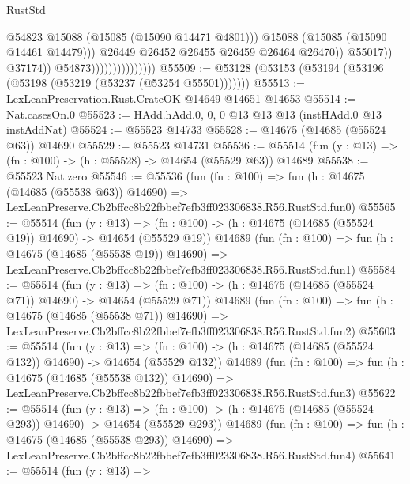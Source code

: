 \begin{lexlean}{RustStd}
\begin{coremodule}
                                                  @54823
                                                  @15088
                                                  (@15085 (@15090 @14471 @4801)))
                                                @15088
                                                (@15085 (@15090 @14461 @14479)))
                                              @26449
                                              @26452
                                              @26455
                                              @26459
                                              @26464
                                              @26470))
                                          @55017))
                                      @37174))
                                  @54873)))))))))))))))
@55509 := @53128 (@53153 (@53194 (@53196 (@53198 (@53219 (@53237 (@53254 @55501)))))))
@55513 := LexLeanPreservation.Rust.CrateOK @14649 @14651 @14653
@55514 := Nat.casesOn.{0}
@55523 := HAdd.hAdd.{0, 0, 0} @13 @13 @13 (instHAdd.{0} @13 instAddNat)
@55524 := @55523 @14733
@55528 := @14675 (@14685 (@55524 @63)) @14690
@55529 := @55523 @14731
@55536 := @55514 (fun (y : @13) => (fn : @100) -> (h : @55528) -> @14654 (@55529 @63)) @14689
@55538 := @55523 Nat.zero
@55546 := @55536
    (fun (fn : @100) =>
    fun (h : @14675 (@14685 (@55538 @63)) @14690) =>
    LexLeanPreserve.Cb2bffcc8b22fbbef7efb3ff023306838.R56.RustStd.fun0)
@55565 := @55514
    (fun (y : @13) =>
    (fn : @100) -> (h : @14675 (@14685 (@55524 @19)) @14690) -> @14654 (@55529 @19))
    @14689
    (fun (fn : @100) =>
    fun (h : @14675 (@14685 (@55538 @19)) @14690) =>
    LexLeanPreserve.Cb2bffcc8b22fbbef7efb3ff023306838.R56.RustStd.fun1)
@55584 := @55514
    (fun (y : @13) =>
    (fn : @100) -> (h : @14675 (@14685 (@55524 @71)) @14690) -> @14654 (@55529 @71))
    @14689
    (fun (fn : @100) =>
    fun (h : @14675 (@14685 (@55538 @71)) @14690) =>
    LexLeanPreserve.Cb2bffcc8b22fbbef7efb3ff023306838.R56.RustStd.fun2)
@55603 := @55514
    (fun (y : @13) =>
    (fn : @100) -> (h : @14675 (@14685 (@55524 @132)) @14690) -> @14654 (@55529 @132))
    @14689
    (fun (fn : @100) =>
    fun (h : @14675 (@14685 (@55538 @132)) @14690) =>
    LexLeanPreserve.Cb2bffcc8b22fbbef7efb3ff023306838.R56.RustStd.fun3)
@55622 := @55514
    (fun (y : @13) =>
    (fn : @100) -> (h : @14675 (@14685 (@55524 @293)) @14690) -> @14654 (@55529 @293))
    @14689
    (fun (fn : @100) =>
    fun (h : @14675 (@14685 (@55538 @293)) @14690) =>
    LexLeanPreserve.Cb2bffcc8b22fbbef7efb3ff023306838.R56.RustStd.fun4)
@55641 := @55514
    (fun (y : @13) =>

\end{coremodule}
\end{lexlean}
